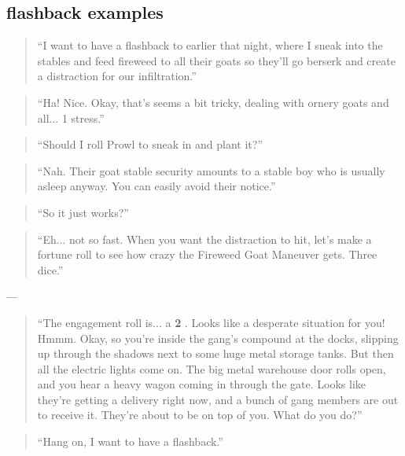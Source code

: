\documentclass[11pt,oneside]{book}
\newcommand{\gameterm}[1]{\textbf{#1}}
\begin{document}
\subsection{flashback examples}

\begin{quote}
	“I want to have a flashback to earlier that night, where I sneak into the stables and feed fireweed to all their goats so they’ll go berserk and create a distraction for our infiltration.”
\end{quote} 

\begin{quote}
	“Ha! Nice. Okay, that’s seems a bit tricky, dealing with ornery goats and all... 1 stress.”
\end{quote} 

\begin{quote}
	“Should I roll Prowl to sneak in and plant it?”
\end{quote} 

\begin{quote}
	“Nah. Their goat stable security amounts to a stable boy who is usually asleep anyway. You can easily avoid their notice.”
\end{quote} 

\begin{quote}
	“So it just works?”
\end{quote} 

\begin{quote}
	“Eh... not so fast. When you want the distraction to hit, let’s make a fortune roll to see how crazy the Fireweed Goat Maneuver gets. Three dice.”
\end{quote} 

---

\begin{quote}
	“The engagement roll is... a \gameterm{2} . Looks like a desperate situation for you! Hmmm. Okay, so you’re inside the gang’s compound at the docks, slipping up through the shadows next to some huge metal storage tanks. But then all the electric lights come on. The big metal warehouse door rolls open, and you hear a heavy wagon coming in through the gate. Looks like they’re getting a delivery right now, and a bunch of gang members are out to receive it. They’re about to be on top of you. What do you do?”
\end{quote} 

\begin{quote}
	“Hang on, I want to have a flashback.”
\end{quote} 
\end{document}
